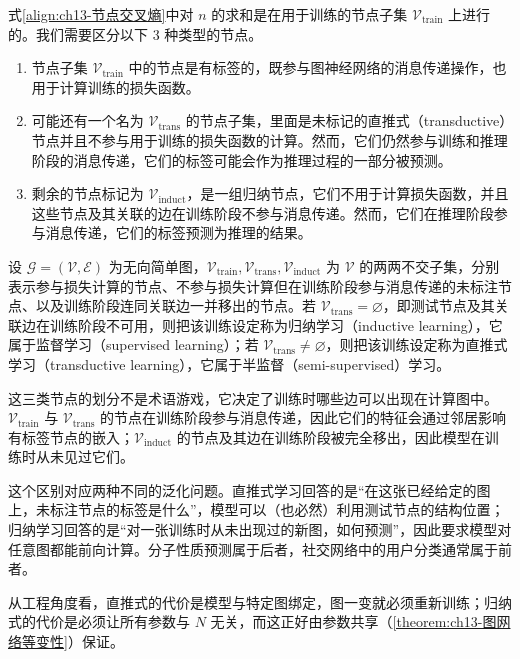 \documentclass[../../main.tex]{subfiles}
\begin{document}
式\eqref{align:ch13-节点交叉熵}中对 $n$ 的求和是在用于训练的节点子集 $\mathcal{V}_{\mathrm{train}}$ 上进行的。我们需要区分以下 3 种类型的节点。

\begin{enumerate}[label=（\arabic*）]
\item 节点子集 $\mathcal{V}_{\mathrm{train}}$ 中的节点是有标签的，既参与图神经网络的消息传递操作，也用于计算训练的损失函数。
\item 可能还有一个名为 $\mathcal{V}_{\mathrm{trans}}$ 的节点子集，里面是未标记的直推式（transductive）节点并且不参与用于训练的损失函数的计算。然而，它们仍然参与训练和推理阶段的消息传递，它们的标签可能会作为推理过程的一部分被预测。
\item 剩余的节点标记为 $\mathcal{V}_{\mathrm{induct}}$，是一组归纳节点，它们不用于计算损失函数，并且这些节点及其关联的边在训练阶段不参与消息传递。然而，它们在推理阶段参与消息传递，它们的标签预测为推理的结果。
\end{enumerate}

\begin{definition}[归纳学习与直推式学习]\label{definition:ch13-归纳与直推学习}
设 $\mathcal{G}=(\mathcal{V},\mathcal{E})$ 为无向简单图，$\mathcal{V}_{\mathrm{train}},\mathcal{V}_{\mathrm{trans}},\mathcal{V}_{\mathrm{induct}}$ 为 $\mathcal{V}$ 的两两不交子集，分别表示参与损失计算的节点、不参与损失计算但在训练阶段参与消息传递的未标注节点、以及训练阶段连同关联边一并移出的节点。若 $\mathcal{V}_{\mathrm{trans}}=\varnothing$，即测试节点及其关联边在训练阶段不可用，则把该训练设定称为归纳学习（inductive learning），它属于监督学习（supervised learning）；若 $\mathcal{V}_{\mathrm{trans}}\neq\varnothing$，则把该训练设定称为直推式学习（transductive learning），它属于半监督（semi-supervised）学习。
\end{definition}

\begin{remark}
这三类节点的划分不是术语游戏，它决定了训练时哪些边可以出现在计算图中。$\mathcal{V}_{\mathrm{train}}$ 与 $\mathcal{V}_{\mathrm{trans}}$ 的节点在训练阶段参与消息传递，因此它们的特征会通过邻居影响有标签节点的嵌入；$\mathcal{V}_{\mathrm{induct}}$ 的节点及其边在训练阶段被完全移出，因此模型在训练时从未见过它们。\par
这个区别对应两种不同的泛化问题。直推式学习回答的是“在这张已经给定的图上，未标注节点的标签是什么”，模型可以（也必然）利用测试节点的结构位置；归纳学习回答的是“对一张训练时从未出现过的新图，如何预测”，因此要求模型对任意图都能前向计算。分子性质预测属于后者，社交网络中的用户分类通常属于前者。\par
从工程角度看，直推式的代价是模型与特定图绑定，图一变就必须重新训练；归纳式的代价是必须让所有参数与 $N$ 无关，而这正好由参数共享（\cref{theorem:ch13-图网络等变性}）保证。
\end{remark}
\end{document}
